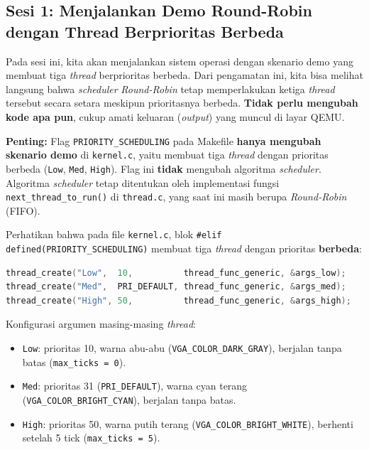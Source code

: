 \subsection{Sesi 1: Menjalankan Demo Round-Robin dengan Thread Berprioritas Berbeda}
\label{sec:m11-sesi-1}

Pada sesi ini, kita akan menjalankan sistem operasi dengan skenario demo yang membuat tiga \textit{thread} berprioritas berbeda. Dari pengamatan ini, kita bisa melihat langsung bahwa \textit{scheduler} \textit{Round-Robin} tetap memperlakukan ketiga \textit{thread} tersebut secara setara meskipun prioritasnya berbeda. \textbf{Tidak perlu mengubah kode apa pun}, cukup amati keluaran (\textit{output}) yang muncul di layar QEMU.

\textbf{Penting:} Flag \texttt{PRIORITY\_SCHEDULING} pada Makefile \textbf{hanya mengubah skenario demo} di \texttt{kernel.c}, yaitu membuat tiga \textit{thread} dengan prioritas berbeda (\texttt{Low}, \texttt{Med}, \texttt{High}). Flag ini \textbf{tidak} mengubah algoritma \textit{scheduler}. Algoritma \textit{scheduler} tetap ditentukan oleh implementasi fungsi \texttt{next\_thread\_to\_run()} di \texttt{thread.c}, yang saat ini masih berupa \textit{Round-Robin} (FIFO).

Perhatikan bahwa pada file \texttt{kernel.c}, blok \texttt{\#elif defined(PRIORITY\_SCHEDULING)} membuat tiga \textit{thread} dengan prioritas \textbf{berbeda}:

\begin{lstlisting}[language=C, caption={Pembuatan thread dengan prioritas berbeda di kernel.c}]
thread_create("Low",  10,          thread_func_generic, &args_low);
thread_create("Med",  PRI_DEFAULT, thread_func_generic, &args_med);
thread_create("High", 50,          thread_func_generic, &args_high);
\end{lstlisting}

Konfigurasi argumen masing-masing \textit{thread}:
\begin{itemize}
	\item \texttt{Low}: prioritas 10, warna abu-abu (\texttt{VGA\_COLOR\_DARK\_GRAY}), berjalan tanpa batas (\texttt{max\_ticks = 0}).
	\item \texttt{Med}: prioritas 31 (\texttt{PRI\_DEFAULT}), warna cyan terang (\texttt{VGA\_COLOR\_BRIGHT\_CYAN}), berjalan tanpa batas.
	\item \texttt{High}: prioritas 50, warna putih terang (\texttt{VGA\_COLOR\_BRIGHT\_WHITE}), berhenti setelah 5 tick (\texttt{max\_ticks = 5}).
\end{itemize}

